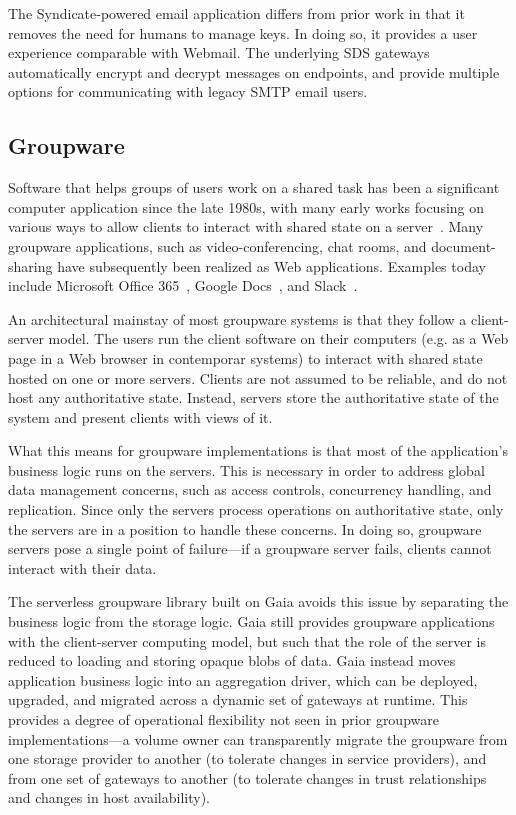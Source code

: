 The Syndicate-powered email application differs from prior work in that it removes the
need for humans to manage keys.  In doing so, it provides a user experience
comparable with Webmail.  The underlying SDS gateways automatically encrypt and
decrypt messages on endpoints, and provide multiple options for communicating
with legacy SMTP email users.

\subsection{Groupware}

Software that helps groups of users work on a shared task has been a significant
computer application since the late 1980s, with many early works focusing
on various ways to allow clients to interact with shared state on a server~\cite{readings-in-groupware}.
Many groupware applications, such as video-conferencing, chat rooms,
and document-sharing have subsequently been realized as Web applications.
Examples today include Microsoft Office 365~\cite{microsoft-apps}, Google
Docs~\cite{google-docs}, and Slack~\cite{slack}.

An architectural mainstay of most groupware systems is that they follow a client-server model.
The users run the client software on their computers (e.g.
as a Web page in a Web browser in contemporar systems) to interact with shared state hosted on one or
more servers.  Clients are not assumed to be reliable, and do not host any
authoritative state.  Instead, servers store the authoritative state of the system and
present clients with views of it.

What this means for groupware implementations is that most of the application's business logic runs on the
servers.  This is necessary in order to address global data management
concerns, such as access controls, concurrency handling, and
replication.  Since only the servers process operations on authoritative state, only
the servers are in a position to handle these concerns.  In doing so, groupware
servers pose a single point of failure---if a groupware server fails, clients
cannot interact with their data.

The serverless groupware library built on Gaia
avoids this issue by separating the business logic from the storage logic.
Gaia still provides groupware applications with the client-server computing model,
but such that the role of the server is reduced to loading
and storing opaque blobs of data.  Gaia instead
moves application business logic into an aggregation driver, which can be
deployed, upgraded, and migrated across a dynamic set of gateways at runtime.
This provides a degree of operational flexibility not seen in prior groupware
implementations---a volume owner can transparently migrate the groupware from
one storage provider to another (to tolerate changes in service providers),
and from one set of gateways to another (to tolerate changes in trust relationships and
changes in host availability).

